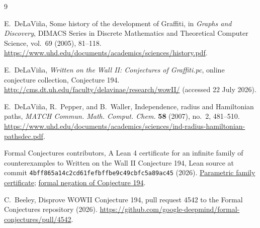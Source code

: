 \documentclass[11pt]{article}
\begin{document}
\begin{thebibliography}{9}

E.~DeLaVi{\~n}a,
\newblock Some history of the development of {Graffiti},
\newblock in \emph{Graphs and Discovery}, DIMACS Series in Discrete Mathematics and
  Theoretical Computer Science, vol.~69 (2005), 81--118.
\newblock \url{https://www.uhd.edu/documents/academics/sciences/history.pdf}.

E.~DeLaVi{\~n}a,
\newblock \emph{Written on the Wall {II}: Conjectures of {Graffiti.pc}},
\newblock online conjecture collection, Conjecture 194.
\newblock \url{http://cms.dt.uh.edu/faculty/delavinae/research/wowII/}
  (accessed 22 July 2026).

E.~DeLaVi{\~n}a, R.~Pepper, and B.~Waller,
\newblock Independence, radius and Hamiltonian paths,
\newblock \emph{MATCH Commun. Math. Comput. Chem.} \textbf{58} (2007), no.~2,
  481--510.
\newblock \url{https://www.uhd.edu/documents/academics/sciences/ind-radius-hamiltonian-pathsdec.pdf}.

Formal Conjectures contributors,
\newblock A {Lean 4} certificate for an infinite family of counterexamples to Written on
  the Wall {II} Conjecture 194,
\newblock Lean source at commit
  \texttt{4bff865a14c2cd61fefbffbe9c49cbfc5a89ac45} (2026).
\newblock \href{https://github.com/anagnorisis2peripeteia/formal-conjectures/blob/4bff865a14c2cd61fefbffbe9c49cbfc5a89ac45/FormalConjectures/WrittenOnTheWallII/Proofs/GraphConjecture194.lean\#L725-L735}{Parametric family certificate};
\href{https://github.com/anagnorisis2peripeteia/formal-conjectures/blob/4bff865a14c2cd61fefbffbe9c49cbfc5a89ac45/FormalConjectures/WrittenOnTheWallII/GraphConjecture194.lean\#L128-L140}{formal negation of Conjecture 194}.

C.~Beeley,
\newblock Disprove {WOWII} Conjecture 194,
\newblock pull request 4542 to the Formal Conjectures repository (2026).
\newblock \url{https://github.com/google-deepmind/formal-conjectures/pull/4542}.

\end{thebibliography}
\end{document}
